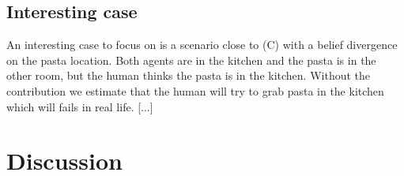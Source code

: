 \documentclass[letterpaper]{article} %
\begin{document}

\subsection{Interesting case}

An interesting case to focus on is a scenario close to (C) with a belief divergence on the pasta location. Both agents are in the kitchen and the pasta is in the other room, but the human thinks the pasta is in the kitchen. Without the contribution we estimate that the human will try to grab pasta in the kitchen which will fails in real life. [...] 



\section{Discussion}
\end{document}
